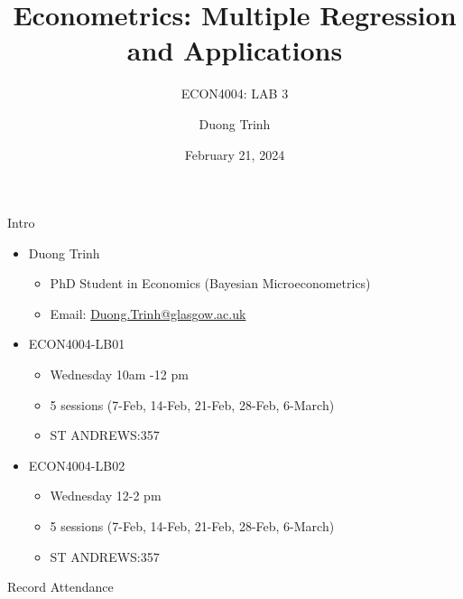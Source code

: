 \documentclass[
  10pt,
  ignorenonframetext,
]{beamer}
\title{Econometrics: Multiple Regression and Applications}
\subtitle{ECON4004: LAB 3}
\author{Duong Trinh}
\date{February 21, 2024}
\institute{University of Glasgow}
\providecommand{\tightlist}{%
  \setlength{\itemsep}{0pt}\setlength{\parskip}{0pt}}
\begin{document}
\frame{\titlepage}

\begin{frame}{Intro}
\protect\hypertarget{intro}{}
\begin{itemize}
\tightlist
\item
  Duong Trinh

  \begin{itemize}
  \tightlist
  \item
    PhD Student in Economics (Bayesian Microeconometrics)
  \item
    Email: \underline{Duong.Trinh@glasgow.ac.uk}
  \end{itemize}
\end{itemize}

\vspace{3mm}

\begin{itemize}
\tightlist
\item
  ECON4004-LB01

  \begin{itemize}
  \tightlist
  \item
    Wednesday 10am -12 pm
  \item
    5 sessions (7-Feb, 14-Feb, 21-Feb, 28-Feb, 6-March)
  \item
    ST ANDREWS:357
  \end{itemize}
\item
  ECON4004-LB02

  \begin{itemize}
  \tightlist
  \item
    Wednesday 12-2 pm
  \item
    5 sessions (7-Feb, 14-Feb, 21-Feb, 28-Feb, 6-March)
  \item
    ST ANDREWS:357
  \end{itemize}
\end{itemize}
\end{frame}

\begin{frame}{Record Attendance}
\protect\hypertarget{record-attendance}{}
\end{frame}
\end{document}
